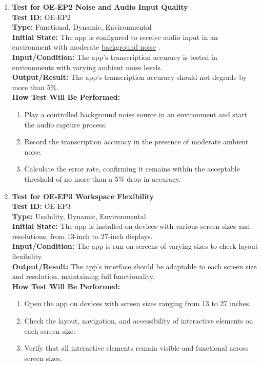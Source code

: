 \documentclass[12pt, titlepage]{article}
\begin{document}
\begin{enumerate}
    \item \textbf{Test for OE-EP2 Noise and Audio Input Quality} \\
      \newline
      \textbf{Test ID:} OE-EP2 \\
      \textbf{Type:} Functional, Dynamic, Environmental \\
      \textbf{Initial State:} The app is configured to receive audio input in an environment with moderate \href{https://github.com/JaakLipp/ScoreGen/tree/main/test/TestingDatasets/noise-samples}{background noise} \cite{noise}. \\
      \textbf{Input/Condition:} The app’s transcription accuracy is tested in environments with varying ambient noise levels. \\
      \textbf{Output/Result:} The app’s transcription accuracy should not degrade by more than 5\%. \\
      \textbf{How Test Will Be Performed:}
      \begin{enumerate}
          \item Play a controlled background noise source in an environment and start the audio capture process.
          \item Record the transcription accuracy in the presence of moderate ambient noise.
          \item Calculate the error rate, confirming it remains within the acceptable threshold of no more than a 5\% drop in accuracy.
      \end{enumerate}

    \item \textbf{Test for OE-EP3 Workspace Flexibility} \\
      \newline
      \textbf{Test ID:} OE-EP3 \\
      \textbf{Type:} Usability, Dynamic, Environmental \\
      \textbf{Initial State:} The app is installed on devices with various screen sizes and resolutions, from 13-inch to 27-inch displays. \\
      \textbf{Input/Condition:} The app is run on screens of varying sizes to check layout flexibility. \\
      \textbf{Output/Result:} The app’s interface should be adaptable to each screen size and resolution, maintaining full functionality. \\
      \textbf{How Test Will Be Performed:}
      \begin{enumerate}
          \item Open the app on devices with screen sizes ranging from 13 to 27 inches.
          \item Check the layout, navigation, and accessibility of interactive elements on each screen size.
          \item Verify that all interactive elements remain visible and functional across screen sizes.
      \end{enumerate}


\end{enumerate}
\end{document}
